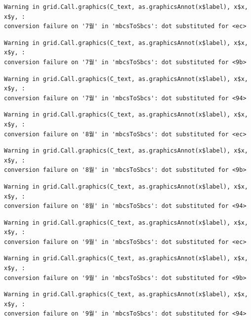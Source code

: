 \documentclass[
  letterpaper,
  DIV=11,
  numbers=noendperiod]{scrreprt}
\begin{document}
\begin{verbatim}
Warning in grid.Call.graphics(C_text, as.graphicsAnnot(x$label), x$x, x$y, :
conversion failure on '7월' in 'mbcsToSbcs': dot substituted for <ec>
\end{verbatim}

\begin{verbatim}
Warning in grid.Call.graphics(C_text, as.graphicsAnnot(x$label), x$x, x$y, :
conversion failure on '7월' in 'mbcsToSbcs': dot substituted for <9b>
\end{verbatim}

\begin{verbatim}
Warning in grid.Call.graphics(C_text, as.graphicsAnnot(x$label), x$x, x$y, :
conversion failure on '7월' in 'mbcsToSbcs': dot substituted for <94>
\end{verbatim}

\begin{verbatim}
Warning in grid.Call.graphics(C_text, as.graphicsAnnot(x$label), x$x, x$y, :
conversion failure on '8월' in 'mbcsToSbcs': dot substituted for <ec>
\end{verbatim}

\begin{verbatim}
Warning in grid.Call.graphics(C_text, as.graphicsAnnot(x$label), x$x, x$y, :
conversion failure on '8월' in 'mbcsToSbcs': dot substituted for <9b>
\end{verbatim}

\begin{verbatim}
Warning in grid.Call.graphics(C_text, as.graphicsAnnot(x$label), x$x, x$y, :
conversion failure on '8월' in 'mbcsToSbcs': dot substituted for <94>
\end{verbatim}

\begin{verbatim}
Warning in grid.Call.graphics(C_text, as.graphicsAnnot(x$label), x$x, x$y, :
conversion failure on '9월' in 'mbcsToSbcs': dot substituted for <ec>
\end{verbatim}

\begin{verbatim}
Warning in grid.Call.graphics(C_text, as.graphicsAnnot(x$label), x$x, x$y, :
conversion failure on '9월' in 'mbcsToSbcs': dot substituted for <9b>
\end{verbatim}

\begin{verbatim}
Warning in grid.Call.graphics(C_text, as.graphicsAnnot(x$label), x$x, x$y, :
conversion failure on '9월' in 'mbcsToSbcs': dot substituted for <94>
\end{verbatim}
\end{document}
